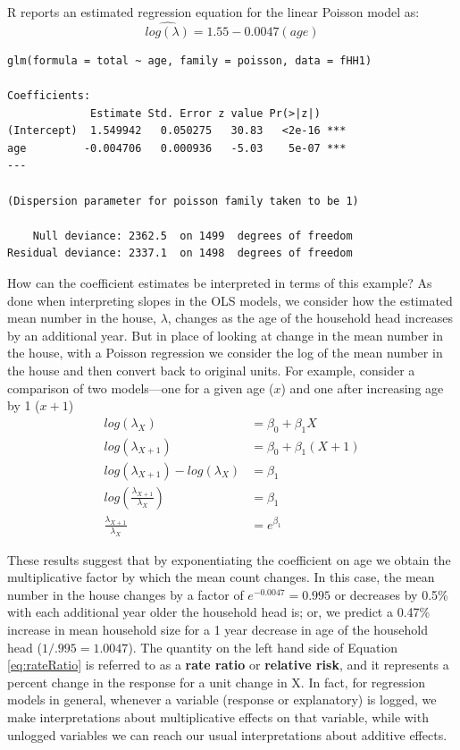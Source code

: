 \documentclass[
]{krantz}
\begin{document}
R reports an estimated regression equation for the linear Poisson model as:
\[
\widehat{log(\lambda)} = 1.55 - 0.0047 (age)
\]

\begin{verbatim}
glm(formula = total ~ age, family = poisson, data = fHH1)

Coefficients:
             Estimate Std. Error z value Pr(>|z|)    
(Intercept)  1.549942   0.050275   30.83   <2e-16 ***
age         -0.004706   0.000936   -5.03    5e-07 ***
---

(Dispersion parameter for poisson family taken to be 1)

    Null deviance: 2362.5  on 1499  degrees of freedom
Residual deviance: 2337.1  on 1498  degrees of freedom
\end{verbatim}

How can the coefficient estimates be interpreted in terms of this example? As done when interpreting slopes in the OLS models, we consider how the estimated mean number in the house, \(\lambda\), changes as the age of the household head increases by an additional year. But in place of looking at change in the mean number in the house, with a Poisson regression we consider the log of the mean number in the house and then convert back to original units. For example, consider a comparison of two models---one for a given age (\(x\)) and one after increasing age by 1 (\(x+1\))
\begin{align}
log(\lambda_X) &= \beta_0 + \beta_1X \\
log(\lambda_{X+1}) &= \beta_0 + \beta_1(X+1) \\
log(\lambda_{X+1})-log(\lambda_X) &=  \beta_1 \\
log \left(\frac{\lambda_{X+1}}{\lambda_X}\right)   &= \beta_1\\
\frac{\lambda_{X+1}}{\lambda_X} &= e^{\beta_1}
\label{eq:rateRatio}
\end{align}

These results suggest that by exponentiating the coefficient on age we obtain the multiplicative factor by which the mean count changes. In this case, the mean number in the house changes by a factor of \(e^{-0.0047}=0.995\) or decreases by 0.5\% with each additional year older the household head is; or, we predict a 0.47\% increase in mean household size for a 1 year decrease in age of the household head (\(1/.995=1.0047\)). The quantity on the left hand side of Equation \eqref{eq:rateRatio} is referred to as a \textbf{rate ratio} or \textbf{relative risk}, and it represents a percent change in the response for a unit change in X. In fact, for regression models in general, whenever a variable (response or explanatory) is logged, we make interpretations about multiplicative effects on that variable, while with unlogged variables we can reach our usual interpretations about additive effects.
\end{document}
